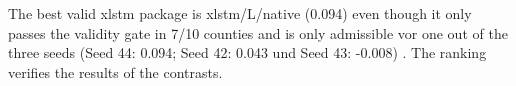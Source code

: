 The best valid xlstm package is xlstm/L/native (0.094) even though it only passes the validity gate in 7/10 counties and is only admissible vor one out of the three seeds (Seed 44: 0.094; Seed 42: 0.043 und Seed 43: -0.008) . The ranking verifies the results of the contrasts. 
%
%

